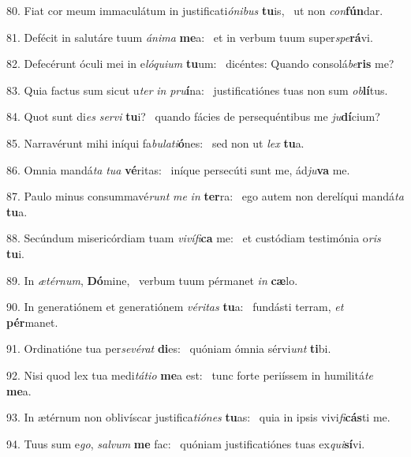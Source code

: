 80. Fiat cor meum immaculátum in justificati\textit{ó}\textit{ni}\textit{bus} \textbf{tu}is, \ast\  ut non \textit{con}\textbf{fún}dar.\

81. Defécit in salutáre tuum \textit{á}\textit{ni}\textit{ma} \textbf{me}a: \ast\  et in verbum tuum super\textit{spe}\textbf{rá}vi.\

82. Defecérunt óculi mei in e\textit{ló}\textit{qui}\textit{um} \textbf{tu}um: \ast\  dicéntes: Quando consolá\textit{be}\textbf{ris} me?\

83. Quia factus sum sicut u\textit{ter} \textit{in} \textit{pru}\textbf{í}na: \ast\  justificatiónes tuas non sum \textit{ob}\textbf{lí}tus.\

84. Quot sunt di\textit{es} \textit{ser}\textit{vi} \textbf{tu}i? \ast\  quando fácies de persequéntibus me \textit{ju}\textbf{dí}cium?\

85. Narravérunt mihi iníqui fa\textit{bu}\textit{la}\textit{ti}\textbf{ó}nes: \ast\  sed non ut \textit{lex} \textbf{tu}a.\

86. Omnia mandá\textit{ta} \textit{tu}\textit{a} \textbf{vé}ritas: \ast\  iníque persecúti sunt me, ád\textit{ju}\textbf{va} me.\

87. Paulo minus consummavé\textit{runt} \textit{me} \textit{in} \textbf{ter}ra: \ast\  ego autem non derelíqui mandá\textit{ta} \textbf{tu}a.\

88. Secúndum misericórdiam tuam \textit{vi}\textit{ví}\textit{fi}\textbf{ca} me: \ast\  et custódiam testimónia o\textit{ris} \textbf{tu}i.\

89. In \textit{æ}\textit{tér}\textit{num}, \textbf{Dó}mine, \ast\  verbum tuum pérmanet \textit{in} \textbf{cæ}lo.\

90. In generatiónem et generatiónem \textit{vé}\textit{ri}\textit{tas} \textbf{tu}a: \ast\  fundásti terram, \textit{et} \textbf{pér}manet.\

91. Ordinatióne tua per\textit{se}\textit{vé}\textit{rat} \textbf{di}es: \ast\  quóniam ómnia sérvi\textit{unt} \textbf{ti}bi.\

92. Nisi quod lex tua medi\textit{tá}\textit{ti}\textit{o} \textbf{me}a est: \ast\  tunc forte periíssem in humilitá\textit{te} \textbf{me}a.\

93. In ætérnum non oblivíscar justifica\textit{ti}\textit{ó}\textit{nes} \textbf{tu}as: \ast\  quia in ipsis vivi\textit{fi}\textbf{cás}ti me.\

94. Tuus sum e\textit{go}, \textit{sal}\textit{vum} \textbf{me} fac: \ast\  quóniam justificatiónes tuas ex\textit{qui}\textbf{sí}vi.\

